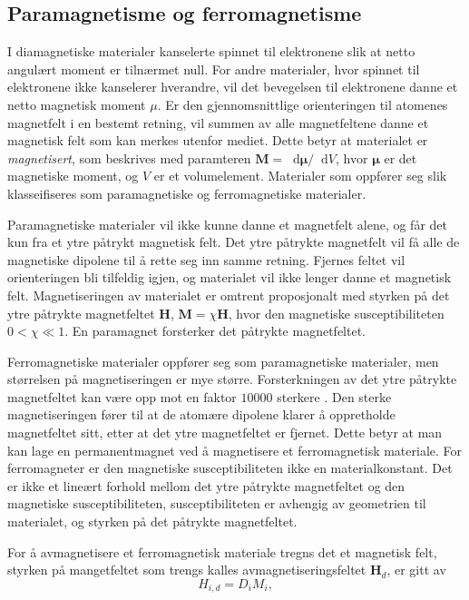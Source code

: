 \documentclass[%
 reprint,
 amsmath,amssymb,
 aps,
]{revtex4-1}
\newcommand*\diff{\mathop{}\!\mathrm{d}}
\begin{document}
\subsection{Paramagnetisme og ferromagnetisme}
I diamagnetiske materialer kanselerte spinnet til elektronene slik at netto angulært moment er tilnærmet null. For andre materialer, hvor spinnet til elektronene ikke kanselerer hverandre, vil det bevegelsen til elektronene danne et netto magnetisk moment $\mu$. Er den gjennomsnittlige orienteringen til atomenes magnetfelt i en bestemt retning, vil summen av alle magnetfeltene danne et magnetisk felt som kan merkes utenfor mediet. Dette betyr at materialet er \textit{magnetisert}, som beskrives med paramteren $\bm{M} = \diff\bm{\mu}/\diff V$, hvor $\bm{\mu}$ er det magnetiske moment, og $V$ er et volumelement. Materialer som oppfører seg slik klasseifiseres som paramagnetiske og ferromagnetiske materialer.\par
Paramagnetiske materialer vil ikke kunne danne et magnetfelt alene, og får det kun fra et ytre påtrykt magnetisk felt. Det ytre påtrykte magnetfelt vil få alle de magnetiske dipolene til å rette seg inn samme retning. Fjernes feltet vil orienteringen bli tilfeldig igjen, og materialet vil ikke lenger danne et magnetisk felt. Magnetiseringen av materialet er omtrent proposjonalt med styrken på det ytre påtrykte magnetfeltet $\bm{H}$, $\bm{M} = \chi\bm{H}$, hvor den magnetiske susceptibiliteten $0<\chi\ll1$. En paramagnet forsterker det påtrykte magnetfeltet.
\par
Ferromagnetiske materialer oppfører seg som paramagnetiske materialer, men størrelsen på magnetiseringen er mye større. Forsterkningen av det ytre påtrykte magnetfeltet kan være opp mot en faktor $10 000$ sterkere \cite{oppgave}. Den sterke magnetiseringen fører til at de atomære dipolene klarer å oppretholde magnetfeltet sitt, etter at det ytre magnetfeltet er fjernet. Dette betyr at man kan lage en permanentmagnet ved å magnetisere et ferromagnetisk materiale. For ferromagneter er den magnetiske susceptibiliteten ikke en materialkonstant. Det er ikke et lineært forhold mellom det ytre påtrykte magnetfeltet og den magnetiske susceptibiliteten, susceptibiliteten er avhengig av geometrien til materialet, og styrken på det påtrykte magnetfeltet.
\par
For å avmagnetisere et ferromagnetisk materiale tregns det et magnetisk felt, styrken på mangetfeltet som trengs kalles avmagnetiseringsfeltet $\bm{H}_d$, er gitt av
\begin{equation}
  H_{i, d} = D_iM_i,
\end{equation}
\end{document}
